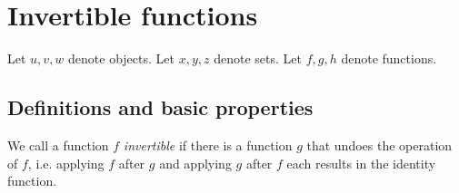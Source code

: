 \documentclass[../../set-theory.tex]{subfiles}
\begin{document}
  \section{Invertible functions}

  \begin{forthel}
  \end{forthel}

  \begin{forthel}
    Let $u,v,w$ denote objects.
    Let $x,y,z$ denote sets.
    Let $f,g,h$ denote functions.
  \end{forthel}


  \subsection{Definitions and basic properties}

  We call a function $f$ \textit{invertible} if there is a function $g$ that
  undoes the operation of $f$, i.e. applying $f$ after $g$ and applying $g$
  after $f$ each results in the identity function.
\end{document}
